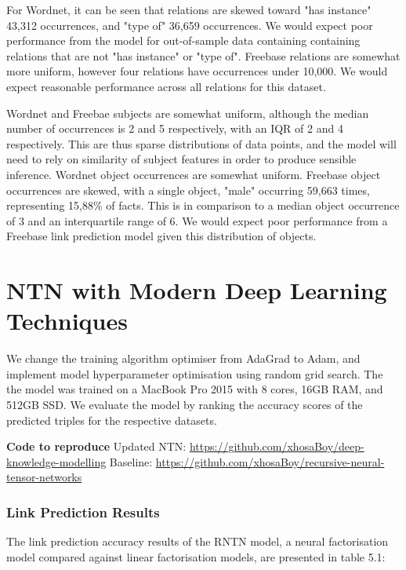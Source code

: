 For Wordnet, it can be seen that relations are skewed toward "has instance" 43,312 occurrences, and "type of" 36,659 occurrences. We would expect poor performance from the model for out-of-sample data containing
containing relations that are not "has instance" or "type of". Freebase relations are somewhat more uniform, however four relations have occurrences under 10,000. We would expect reasonable performance across all relations for this dataset. \newpage

Wordnet and Freebae subjects are somewhat uniform, although the median number of occurrences is 2 and 5 respectively, with an IQR of 2 and 4 respectively. This are thus sparse distributions of data points, and the model will need to rely on 
similarity of subject features in order to produce sensible inference. Wordnet object occurrences are somewhat uniform. Freebase object occurrences are skewed, with a single object, "male" occurring 59,663 times, representing 15,88\% of facts. This is in comparison to a median object occurrence of 3 and an interquartile range of 6.
We would expect poor performance from a Freebase link prediction model given this distribution of objects. 


\section{NTN with Modern Deep Learning Techniques}

We change the training algorithm optimiser from AdaGrad to Adam, and implement model hyperparameter optimisation using random grid search. The the model was trained on a MacBook Pro 2015 with 8 cores, 16GB RAM, and 512GB SSD. We evaluate the model by ranking the accuracy scores of the predicted triples for the respective datasets. \bigskip

\textbf{Code to reproduce} \newline
Updated NTN:  \url{https://github.com/xhosaBoy/deep-knowledge-modelling} \newline
Baseline: \url{https://github.com/xhosaBoy/recursive-neural-tensor-networks}

\subsubsection{Link Prediction Results}
The link prediction accuracy results of the RNTN model, a neural factorisation model compared against linear factorisation models, are presented in table 5.1:

